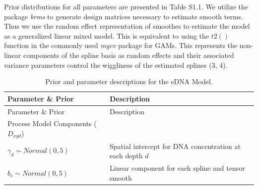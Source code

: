 \documentclass[
]{article}
\begin{document}
Prior distributions for all parameters are presented in Table S1.1. We
utilize the package \emph{brms} to generate design matrices necessary to
estimate smooth terms. Thus we use the random effect representation of
smoothes to estimate the model as a generalized linear mixed model. This
is equivalent to using the \(t2()\) function in the commonly used
\emph{mgcv} package for GAMs. This represents the non-linear components
of the spline basis as random effects and their associated variance
parameters control the wiggliness of the estimated splines (3, 4).

\begin{longtable}[]{@{}ll@{}}
\caption{Prior and parameter descriptions for the eDNA
Model.}\tabularnewline
\toprule
\begin{minipage}[b]{0.47\columnwidth}\raggedright
Parameter \& Prior\strut
\end{minipage} & \begin{minipage}[b]{0.47\columnwidth}\raggedright
Description\strut
\end{minipage}\tabularnewline
\midrule
\endfirsthead
\toprule
\begin{minipage}[b]{0.47\columnwidth}\raggedright
Parameter \& Prior\strut
\end{minipage} & \begin{minipage}[b]{0.47\columnwidth}\raggedright
Description\strut
\end{minipage}\tabularnewline
\midrule
\endhead
\begin{minipage}[t]{0.47\columnwidth}\raggedright
Process Model Components (\(D_{xyd}\))\strut
\end{minipage} & \begin{minipage}[t]{0.47\columnwidth}\raggedright
\strut
\end{minipage}\tabularnewline
\begin{minipage}[t]{0.47\columnwidth}\raggedright
\(\gamma_d \sim Normal(0,5)\)\strut
\end{minipage} & \begin{minipage}[t]{0.47\columnwidth}\raggedright
Spatial intercept for DNA concentration at each depth \(d\)\strut
\end{minipage}\tabularnewline
\begin{minipage}[t]{0.47\columnwidth}\raggedright
\(b_s \sim Normal(0,5)\)\strut
\end{minipage} & \begin{minipage}[t]{0.47\columnwidth}\raggedright
Linear component for each spline and tensor smooth\strut

\end{minipage}
\end{longtable}
\end{document}
